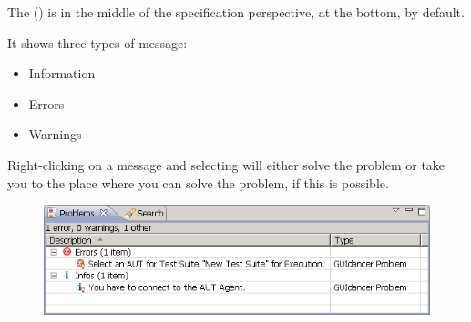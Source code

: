 % 
%
%
The \gdprobview{} () is in the middle of the specification perspective, at the bottom, by default. 

It shows three types of message: 
\begin{itemize}
\item Information
\item Errors
\item Warnings
\end{itemize}


Right-clicking on a message and selecting  will either solve the problem or take you to the place where you can solve the problem, if this is possible.


\begin{figure}[h]
\begin{center}
\includegraphics{Tasks/Problemview/PS/probview}
\caption{\gdprobview}
\label{probview}
\end{center}
\end{figure}




